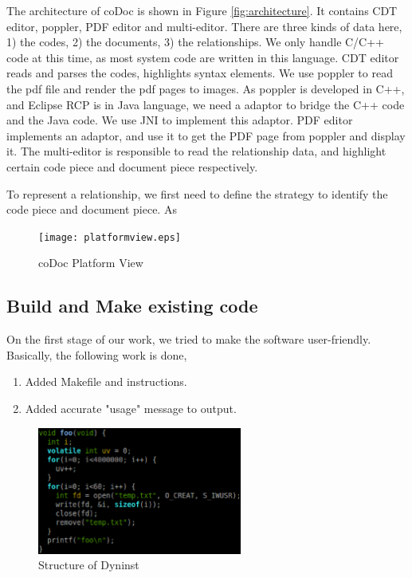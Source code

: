 \documentclass[11pt,letterpaper,oneside]{article}
\begin{document}
The architecture of coDoc is shown in Figure \ref{fig:architecture}. 
It contains CDT editor, poppler, PDF editor and multi-editor.
There are three kinds of data here, 1) the codes, 2) the documents, 3) the relationships.
We only handle C/C++ code at this time, 
as most system code are written in this language.
CDT editor reads and parses the codes, 
highlights syntax elements.
We use poppler to read the pdf file and render the pdf pages to images.
As poppler is developed in C++, and Eclipse RCP is in Java language,
we need a adaptor to bridge the C++ code and the Java code.
We use JNI to implement this adaptor.
PDF editor implements an adaptor, 
and use it to get the PDF page from poppler and display it.
The multi-editor is responsible to read the relationship data,
and highlight certain code piece and document piece respectively.

To represent a relationship, 
we first need to define the strategy to identify the code piece and document piece.
As 


\begin{figure}
\begin{center}
\texttt{[image: platformview.eps]}
\caption{coDoc Platform View}
\label{fig:platformview}
\end{center}
\end{figure}


\subsection{Build and Make existing code}
On the first stage of our work, we tried to make the software user-friendly. Basically, the following work is done,
\begin{enumerate}
\item Added Makefile and instructions.
\item Added accurate "usage" message to output.
\end{enumerate}

\begin{figure}
\begin{center}
\includegraphics[width=0.6\textwidth]{codoc.eps}
\caption{Structure of Dyninst}
\label{fig:codoc}
\end{center}
\end{figure}
\end{document}
